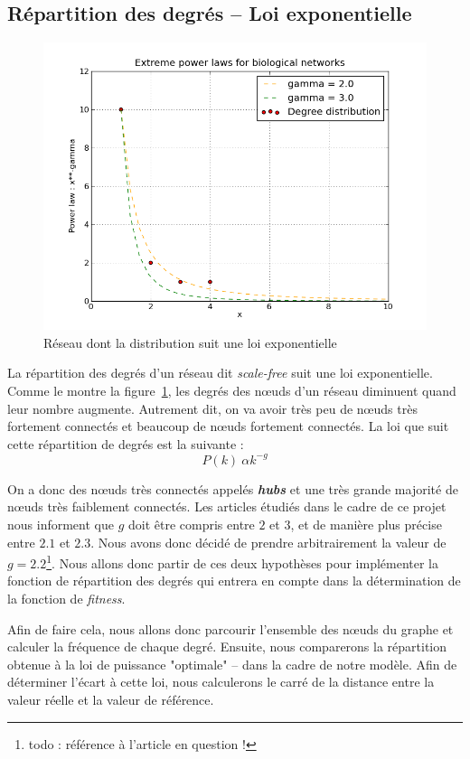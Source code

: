 \subsection{Répartition des degrés -- Loi exponentielle}
\begin{figure}[!h]
\includegraphics[width=\linewidth]{plot.png}
\caption{Réseau dont la distribution suit une loi exponentielle}
\label{scalefree}
\end{figure}
La répartition des degrés d'un réseau dit \textit{scale-free} suit une loi exponentielle. Comme le montre la figure~\ref{scalefree}, les degrés des nœuds d'un réseau diminuent quand leur nombre augmente. Autrement dit, on va avoir très peu de nœuds très fortement connectés et beaucoup de nœuds fortement connectés. La loi que suit cette répartition de degrés est la suivante :
$$ P(k) ~ \alpha k^{-g} $$

On a donc des nœuds très connectés appelés \textit{\textbf{hubs}} et une très grande majorité de nœuds très faiblement connectés.	Les articles étudiés dans le cadre de ce projet nous informent que $g$ doit être compris entre $2$ et $3$, et de manière plus précise entre $2.1$ et $2.3$. Nous avons donc décidé de prendre arbitrairement la valeur de $g=2.2$\footnote{todo : référence à l'article en question !}. Nous allons donc partir de ces deux hypothèses pour implémenter la fonction de répartition des degrés qui entrera en compte dans la détermination de la fonction de \textit{fitness}.

Afin de faire cela, nous allons donc parcourir l'ensemble des nœuds du graphe et calculer la fréquence de chaque degré. Ensuite, nous comparerons la répartition obtenue à la loi de puissance "optimale" -- dans la cadre de notre modèle. Afin de déterminer l'écart à cette loi, nous calculerons le carré de la distance entre la valeur réelle et la valeur de référence.

